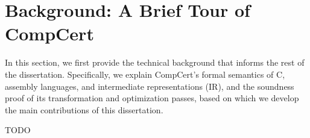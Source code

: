 \section{Background: A Brief Tour of CompCert}
\label{sec:background}

In this section, we first provide the technical background that informs the rest of the
dissertation.  Specifically, we explain CompCert's formal semantics of C, assembly languages, and
intermediate representations (IR), and the soundness proof of its transformation and optimization
passes, based on which we develop the main contributions of this dissertation.

TODO


